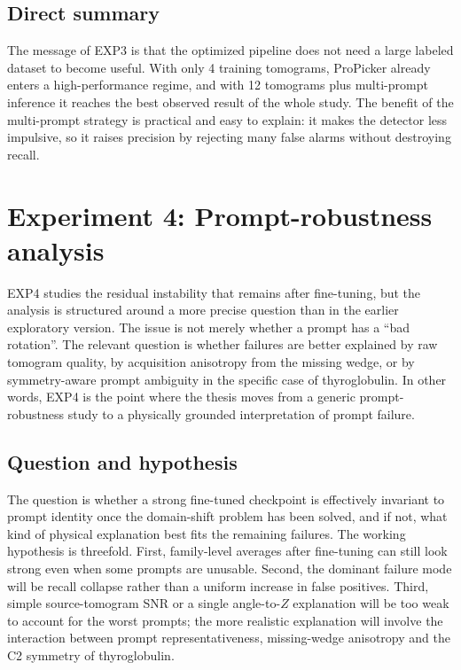 \documentclass[12pt,a4paper]{report}
\begin{document}
\subsection{Direct summary}
The message of EXP3 is that the optimized pipeline does not need a large labeled dataset to become useful. With only 4 training tomograms, ProPicker already enters a high-performance regime, and with 12 tomograms plus multi-prompt inference it reaches the best observed result of the whole study. The benefit of the multi-prompt strategy is practical and easy to explain: it makes the detector less impulsive, so it raises precision by rejecting many false alarms without destroying recall.

\section{Experiment 4: Prompt-robustness analysis}
EXP4 studies the residual instability that remains after fine-tuning, but the analysis is structured around a more precise question than in the earlier exploratory version. The issue is not merely whether a prompt has a \enquote{bad rotation}. The relevant question is whether failures are better explained by raw tomogram quality, by acquisition anisotropy from the missing wedge, or by symmetry-aware prompt ambiguity in the specific case of thyroglobulin. In other words, EXP4 is the point where the thesis moves from a generic prompt-robustness study to a physically grounded interpretation of prompt failure.

\subsection{Question and hypothesis}
The question is whether a strong fine-tuned checkpoint is effectively invariant to prompt identity once the domain-shift problem has been solved, and if not, what kind of physical explanation best fits the remaining failures. The working hypothesis is threefold. First, family-level averages after fine-tuning can still look strong even when some prompts are unusable. Second, the dominant failure mode will be recall collapse rather than a uniform increase in false positives. Third, simple source-tomogram SNR or a single angle-to-\(Z\) explanation will be too weak to account for the worst prompts; the more realistic explanation will involve the interaction between prompt representativeness, missing-wedge anisotropy and the C2 symmetry of thyroglobulin.
\end{document}

